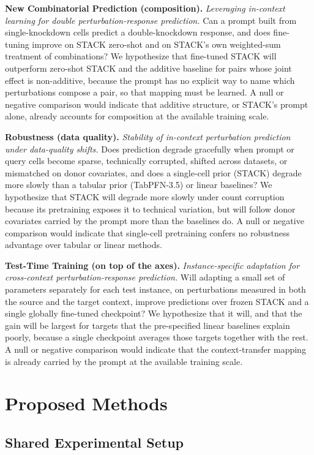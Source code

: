 \documentclass[times, twoside, watermark]{zHenriquesLab-StyleBioRxiv}
\begin{document}
\noindent\textbf{New Combinatorial Prediction (composition).}
\emph{Leveraging in-context learning for double perturbation-response prediction.} Can a prompt built from single-knockdown cells predict a double-knockdown response, and does fine-tuning improve on STACK zero-shot and on STACK's own weighted-sum treatment of combinations? We hypothesize that fine-tuned STACK will outperform zero-shot STACK and the additive baseline for pairs whose joint effect is non-additive, because the prompt has no explicit way to name which perturbations compose a pair, so that mapping must be learned. A null or negative comparison would indicate that additive structure, or STACK's prompt alone, already accounts for composition at the available training scale.

\noindent\textbf{Robustness (data quality).}
\emph{Stability of in-context perturbation prediction under data-quality shifts.} Does prediction degrade gracefully when prompt or query cells become sparse, technically corrupted, shifted across datasets, or mismatched on donor covariates, and does a single-cell prior (STACK) degrade more slowly than a tabular prior (TabPFN-3.5) or linear baselines? We hypothesize that STACK will degrade more slowly under count corruption because its pretraining exposes it to technical variation, but will follow donor covariates carried by the prompt more than the baselines do. A null or negative comparison would indicate that single-cell pretraining confers no robustness advantage over tabular or linear methods.

\noindent\textbf{Test-Time Training (on top of the axes).}
\emph{Instance-specific adaptation for cross-context perturbation-response prediction.} Will adapting a small set of parameters separately for each test instance, on perturbations measured in both the source and the target context, improve predictions over frozen STACK and a single globally fine-tuned checkpoint? We hypothesize that it will, and that the gain will be largest for targets that the pre-specified linear baselines explain poorly, because a single checkpoint averages those targets together with the rest. A null or negative comparison would indicate that the context-transfer mapping is already carried by the prompt at the available training scale.


\section*{Proposed Methods}

\subsection*{Shared Experimental Setup}
\end{document}

